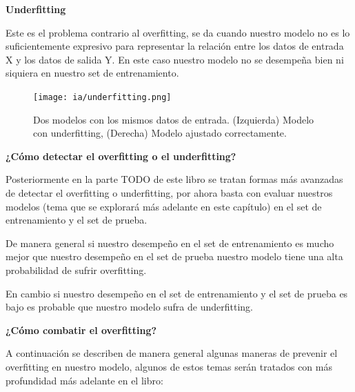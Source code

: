 \documentclass[11pt,fleqn]{book} %
\begin{document}
\textbf{Underfitting}

Este es el problema contrario al overfitting, se da cuando nuestro modelo no es lo suficientemente expresivo para representar la relación entre los datos de entrada X y los datos de salida Y. En este caso nuestro modelo no se desempeña bien ni siquiera en nuestro set de entrenamiento.

\begin{figure}[ht]
\centering\texttt{[image: ia/underfitting.png]}
\caption{Dos modelos con los mismos datos de entrada. (Izquierda) Modelo con underfitting, (Derecha) Modelo ajustado correctamente.}

\label{fig:underfitting} 
\end{figure}

\FloatBarrier
\textbf{¿Cómo detectar el overfitting o el underfitting?}

Posteriormente en la parte TODO de este libro se tratan formas más avanzadas de detectar el overfitting o underfitting, por ahora basta con evaluar nuestros modelos (tema que se explorará más adelante en este capítulo) en el set de entrenamiento y el set de prueba.

De manera general si nuestro desempeño en el set de entrenamiento es mucho mejor que nuestro desempeño en el set de prueba nuestro modelo tiene una alta probabilidad de sufrir overfitting.

En cambio si nuestro desempeño en el set de entrenamiento y el set de prueba es bajo es probable que nuestro modelo sufra de underfitting.

\textbf{¿Cómo combatir el overfitting?}

A continuación se describen de manera general algunas maneras de prevenir el overfitting en nuestro modelo, algunos de estos temas serán tratados con más profundidad más adelante en el libro:
\end{document}

